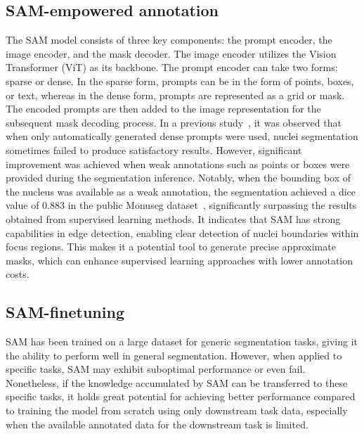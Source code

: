 \documentclass[conference]{IEEEtran}
\begin{document}
\subsection{SAM-empowered annotation}  \label{SAM-empowered annotation}
The SAM model consists of three key components: the prompt encoder, the image encoder, and the mask decoder. The image encoder utilizes the Vision Transformer (ViT) as its backbone. The prompt encoder can take two forms: sparse or dense. In the sparse form, prompts can be in the form of points, boxes, or text, whereas in the dense form, prompts are represented as a grid or mask. The encoded prompts are then added to the image representation for the subsequent mask decoding process. In a previous study~\cite{deng2023segment}, it was observed that when only automatically generated dense prompts were used, nuclei segmentation sometimes failed to produce satisfactory results. However, significant improvement was achieved when weak annotations such as points or boxes were provided during the segmentation inference. Notably, when the bounding box of the nucleus was available as a weak annotation, the segmentation achieved a dice value of 0.883 in the public Monuseg dataset~\cite{kumar2017dataset}, significantly surpassing the results obtained from supervised learning methods. It indicates that SAM has strong capabilities in edge detection, enabling clear detection of nuclei boundaries within focus regions. This makes it a potential tool to generate precise approximate masks, which can enhance supervised learning approaches with lower annotation costs.

\subsection{SAM-finetuning} \label{SAM-finetuning}
SAM has been trained on a large dataset for generic segmentation tasks, giving it the ability to perform well in general segmentation. However, when applied to specific tasks, SAM may exhibit suboptimal performance or even fail. Nonetheless, if the knowledge accumulated by SAM can be transferred to these specific tasks, it holds great potential for achieving better performance compared to training the model from scratch using only downstream task data, especially when the available annotated data for the downstream task is limited. 
\end{document}
